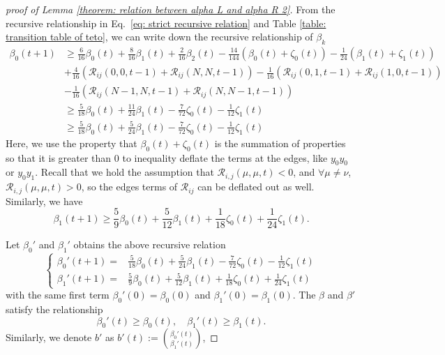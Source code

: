 \documentclass[showpacs,onecolumn,aps,prx,long bibliography,superscriptaddress,notitlepage]{revtex4-1}
\begin{document}
\begin{proof}[proof of Lemma \ref{theorem: relation between alpha L and alpha R 2}]
   From the recursive relationship in Eq.~\eqref{eq: strict recursive relation} and Table \ref{table: transition table of teto}, we can write down the recursive relationship of $\beta_k$
   \begin{align}
    \beta_0(t+1) & \geq \frac{6}{16} \beta_0(t)+\frac{8}{16} \beta_1(t) + \frac{2}{16}\beta_2(t)-\frac{14}{144}\left(\beta_0(t)+\zeta_0(t)\right)-\frac{1}{24}\left(\beta_1(t)+\zeta_1(t)\right)\nonumber\\
    & + \frac{4}{16}(\mathscr{R}_{i j}(0,0, t-1) + \mathscr{R}_{i j}(N,N, t-1)) -  \frac{1}{16}(\mathscr{R}_{i j}(0,1, t-1) + \mathscr{R}_{i j}(1,0, t-1))\nonumber\\
    &- \frac{1}{16}(\mathscr{R}_{i j}(N-1,N, t-1) + \mathscr{R}_{i j}(N,N-1, t-1))\nonumber\\
    & \geq \frac{5}{18} \beta_0(t)+\frac{11}{24} \beta_1(t)-\frac{7}{72} \zeta_0(t)-\frac{1}{12} \zeta_1(t) \\
    & \geq \frac{5}{18} \beta_0(t)+\frac{5}{24} \beta_1(t)-\frac{7}{72} \zeta_0(t)-\frac{1}{12} \zeta_1(t) 
    \end{align}
    Here, we use the property that $\beta_0(t)+\zeta_0(t)$ is the summation of properties so that it is greater than $0$ to inequality deflate the terms at the edges, like $y_0y_0$ or $ y_0y_1$. Recall that we hold the assumption that $\mathscr{R}_{i, j}(\mu, \mu, t)<0$, and $\forall \mu \neq \nu$, $\mathscr{R}_{i, j}(\mu, \mu, t)>0$, so the edges terms of $\mathscr{R}_{i j}$ can be deflated out as well. Similarly, we have
    \begin{equation}
        \beta_1(t+1)  \geq \frac{5}{9} \beta_0(t)+\frac{5}{12} \beta_1(t)+\frac{1}{18} \zeta_0(t)+\frac{1}{24} \zeta_1(t).
    \end{equation}
    
    Let $\beta_0'$ and $\beta_1'$ obtains the above recursive relation
    \begin{equation}
        \begin{cases}
            \beta_0'(t+1) =& \frac{5}{18} \beta_0(t)+\frac{5}{24} \beta_1(t)-\frac{7}{72} \zeta_0(t)-\frac{1}{12} \zeta_1(t) \\
        \beta_1'(t+1)  =& \frac{5}{9} \beta_0(t)+\frac{5}{12} \beta_1(t)+\frac{1}{18} \zeta_0(t)+\frac{1}{24} \zeta_1(t)
        \end{cases}
        \label{eq: zz anonymous 25}
    \end{equation}
    with the same first term $\beta_0'(0) = \beta_0(0)$ and $\beta_1'(0) = \beta_1(0)$. The $\beta$ and $\beta'$ satisfy the relationship
    \begin{equation}
        \beta_0'(t) \geq \beta_0(t),\quad  \beta_1'(t) \geq \beta_1(t).
    \end{equation}
    Similarly, we denote $b'$ as $b'(t):=\binom{\beta_0'(t)}{\beta_1'(t)}$,
    

\end{proof}
\end{document}
